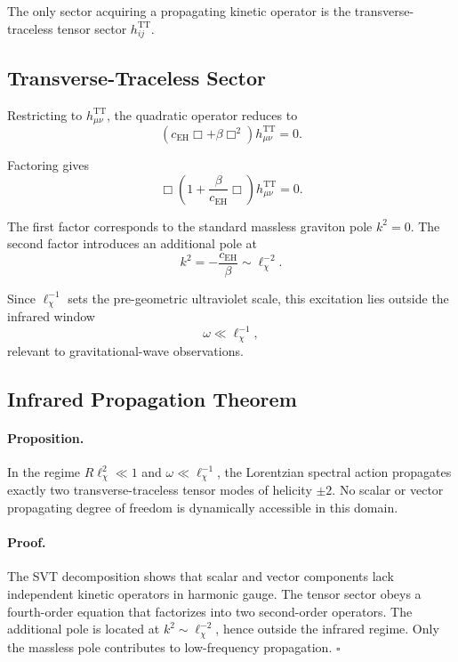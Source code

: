     The only sector acquiring a propagating kinetic operator is the
    transverse-traceless tensor sector $h^{\mathrm{TT}}_{ij}$.

  \subsection{Transverse-Traceless Sector}
    \label{subsec:transverse-traceless-sector}

    Restricting to $h^{\mathrm{TT}}_{\mu\nu}$,
    the quadratic operator reduces to
    \[
      \left(
        c_{\mathrm{EH}}\Box
        +
        \beta \Box^2
      \right)
      h^{\mathrm{TT}}_{\mu\nu}
      =
      0.
    \]

    Factoring gives
    \[
      \Box
      \left(
        1
        +
        \frac{\beta}{c_{\mathrm{EH}}}
        \Box
      \right)
      h^{\mathrm{TT}}_{\mu\nu}
      =
      0.
    \]

    The first factor corresponds to the standard massless graviton pole
    $k^2=0$.
    The second factor introduces an additional pole at
    \[
      k^2
      =
      -\frac{c_{\mathrm{EH}}}{\beta}
      \sim
      \ell_\chi^{-2}.
    \]

    Since $\ell_\chi^{-1}$ sets the pre-geometric ultraviolet scale,
    this excitation lies outside the infrared window
    \[
      \omega \ll \ell_\chi^{-1},
    \]
    relevant to gravitational-wave observations.

  \subsection{Infrared Propagation Theorem}
    \label{subsec:infrared-propagation-theorem}

    \paragraph{Proposition.}
      In the regime $R\ell_\chi^2 \ll 1$ and $\omega \ll \ell_\chi^{-1}$,
      the Lorentzian spectral action propagates exactly two transverse-traceless tensor modes of helicity $\pm 2$.
      No scalar or vector propagating degree of freedom is dynamically accessible in this domain.

    \paragraph{Proof.}
      The SVT decomposition shows that scalar and vector components lack
      independent kinetic operators in harmonic gauge.
      The tensor sector obeys a fourth-order equation that factorizes into two second-order operators.
      The additional pole is located at $k^2 \sim \ell_\chi^{-2}$, hence outside the infrared regime.
      Only the massless pole contributes to low-frequency propagation.
      \hfill $\square$

